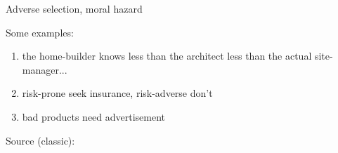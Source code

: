 \begin{frame}{Adverse selection, moral hazard}

    Some examples: 
    
    \medskip
    
    \begin{minipage}{0.7\textwidth}
        \begin{enumerate} 
            \item the home-builder knows less than the architect less than the actual site-manager...
            \item risk-prone seek insurance, risk-adverse don't
            \item bad products need advertisement
        \end{enumerate}
    \end{minipage}
    \par\medskip
    Source (classic): \cite{GeorgeA.Akerlof1970TMfL}
\end{frame}

    

    





